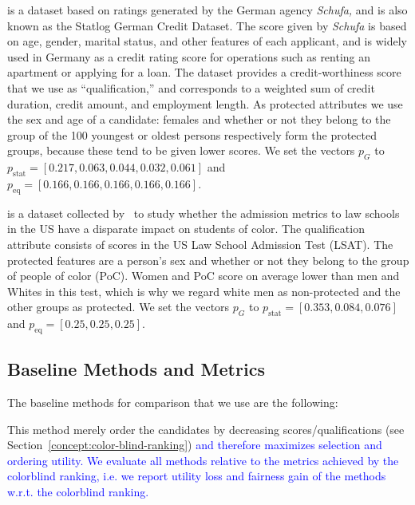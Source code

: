  is a dataset based on ratings generated by the German agency \emph{Schufa,} and is also known as the Statlog German Credit Dataset.
%
The score given by \emph{Schufa} is based on age, gender, marital status, and other features of each applicant, and is widely used in Germany as a credit rating score for operations such as renting an apartment or applying for a loan.
%
The dataset provides a credit-worthiness score that we use as ``qualification,'' and corresponds to a weighted sum of credit duration, credit amount, and employment length.
%
As protected attributes we use the sex and age of a candidate: females and whether or not they belong to the group of the 100 youngest or oldest persons respectively form the protected groups, because these tend to be given lower scores.
%
We set the vectors $p_G$ to $p_{\text{stat}}=[0.217,0.063,0.044,0.032,0.061]$ and $p_{\text{eq}}=[0.166,0.166,0.166,0.166,0.166]$.


 is a dataset collected by~\citet{wightman1998lsac} to study whether the admission metrics to law schools in the US have a disparate impact on students of color.
%
The qualification attribute consists of scores in the US Law School Admission Test (LSAT).
%
The protected features are a person's sex and whether or not they belong to the group of people of color (PoC).
%
Women and PoC score on average lower than men and Whites in this test, which is why we regard white men as non-protected and the other groups as protected.
%
We set the vectors $p_G$ to $p_{\text{stat}}=[0.353,0.084,0.076]$ and $p_{\text{eq}}=[0.25,0.25,0.25]$.


\subsection{Baseline Methods and Metrics}\label{sec:experiments-baselines}

The baseline methods for comparison that we use are the following:

 This method merely order the candidates by decreasing scores/qualifications (see Section~\ref{concept:color-blind-ranking}) \textcolor{blue}{and therefore maximizes selection and ordering utility.
	We evaluate all methods relative to the metrics achieved by the colorblind ranking, i.e. we report utility loss and fairness gain of the methods w.r.t. the colorblind ranking.}

